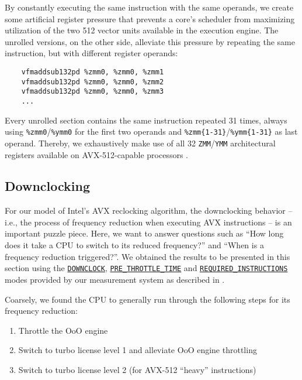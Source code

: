 By constantly executing the same instruction with the same operands, we create some artificial register pressure that prevents a core's scheduler from maximizing utilization of the two \SI[number-unit-product=-]{512}{\bit} vector units available in the execution engine. The unrolled versions, on the other side, alleviate this pressure by repeating the same instruction, but with different register operands:

\begin{center}
	\begin{verbatim}
	vfmaddsub132pd %zmm0, %zmm0, %zmm1
	vfmaddsub132pd %zmm0, %zmm0, %zmm2
	vfmaddsub132pd %zmm0, %zmm0, %zmm3
	...
	\end{verbatim}
\end{center}

Every unrolled section contains the same instruction repeated 31 times, always using \texttt{\%zmm0}/\texttt{\%ymm0} for the first two operands and \texttt{\%zmm\{1-31\}}/\texttt{\%ymm\{1-31\}} as last operand. Thereby, we exhaustively make use of all 32 \texttt{ZMM}/\texttt{YMM} architectural registers available on \gls{AVX-512}-capable processors \cite{intelsdmbasicarch}.

\subsection{Downclocking}
\label{sec:analysis:results:downclocking}

For our model of Intel's \gls{AVX} reclocking algorithm, the downclocking behavior -- i.e., the process of frequency reduction when executing \gls{AVX} instructions -- is an important puzzle piece. Here, we want to answer questions such as \enquote{How long does it take a \gls{CPU} to switch to its reduced frequency?} and \enquote{When is a frequency reduction triggered?}. We obtained the results to be presented in this section using the \hyperref[sec:analysis:design:measurementmodes:downclock]{\texttt{DOWNCLOCK}}, \hyperref[sec:analysis:design:measurementmodes:prethrottlethroughput]{\texttt{PRE\_THROTTLE\_TIME}} and \hyperref[sec:analysis:design:measurementmodes:nonavxtime]{\texttt{REQUIRED\_INSTRUCTIONS}} modes provided by our measurement system as described in .

Coarsely, we found the \gls{CPU} to generally run through the following steps for its frequency reduction:

\begin{enumerate}
	\item Throttle the \acrlong{OoO} engine
	\item Switch to turbo license level 1 and alleviate \gls{OoO} engine throttling
	\item Switch to turbo license level 2 (for \gls{AVX-512} \enquote{heavy} instructions)
\end{enumerate}

